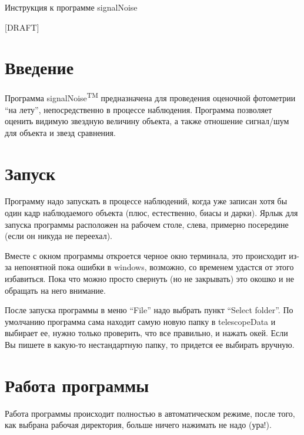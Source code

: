 \documentclass[a4paper,12pt,leqno,notitlepage]{article}
\begin{document}
\begin{center}
  {\Huge Инструкция к программе signalNoise

  [DRAFT]}
\end{center}

\section{Введение}

Программа signalNoise\textsuperscript{TM} предназначена для проведения оценочной фотометрии 
``на лету'', непосредственно в процессе наблюдения. Программа позволяет оценить видимую звездную
величину объекта, а также отношение сигнал/шум для объекта и звезд сравнения.

\section{Запуск}
Программу надо запускать в процессе наблюдений, когда уже записан хотя бы один кадр наблюдаемого объекта
(плюс, естественно, биасы и дарки). Ярлык для запуска программы расположен на рабочем столе, слева,
примерно посередине (если он никуда не переехал).

Вместе с окном программы откроется черное окно терминала, это происходит из-за непонятной пока ошибки в
windows, возможно, со временем удастся от этого избавиться. Пока что можно просто свернуть (но не закрывать)
это окошко и не обращать на него внимание.

После запуска программы в меню ``File'' надо выбрать пункт ``Select folder''. По умолчанию программа сама
находит самую новую папку в telescopeData и выбирает ее, нужно только проверить, что все правильно,
и нажать окей. Если Вы пишете в какую-то нестандартную папку, то придется ее выбирать вручную.

\section{Работа программы}
Работа программы происходит полностью в автоматическом режиме, после того, как выбрана рабочая директория, больше
ничего нажимать не надо (ура!).
\end{document}
